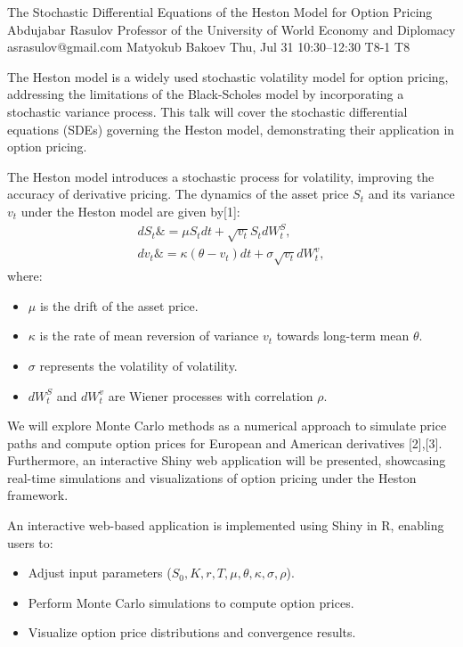 \begin{talk}
  {The Stochastic Differential Equations of the Heston Model for Option Pricing}%
  {Abdujabar Rasulov}%
  {Professor of the University of World Economy and Diplomacy}%
  {asrasulov@gmail.com}%
  {Matyokub Bakoev}%
  {}%
  {Thu, Jul 31 10:30–12:30}%
  {T8-1}%
  {T8}%
  
							
The Heston model is a widely used stochastic volatility model for option pricing, addressing the limitations of the Black-Scholes model by incorporating a stochastic variance process. This talk will cover the stochastic differential equations (SDEs) governing the Heston model, demonstrating their application in option pricing. 

The Heston model introduces a stochastic process for volatility, improving the accuracy of derivative pricing. 
The dynamics of the asset price $S_t$ and its variance $v_t$ under the Heston model are given by[1]:
\begin{align}
    dS_t \&= \mu S_t dt + \sqrt{v_t} S_t dW_t^S, \\
    dv_t \&= \kappa(\theta - v_t) dt + \sigma \sqrt{v_t} dW_t^v,
\end{align}
where:
\begin{itemize}
    \item $\mu$ is the drift of the asset price.
    \item $\kappa$ is the rate of mean reversion of variance $v_t$ towards long-term mean $\theta$.
    \item $\sigma$ represents the volatility of volatility.
    \item $dW_t^S$ and $dW_t^v$ are Wiener processes with correlation $\rho$.
\end{itemize}

We will explore Monte Carlo methods as a numerical approach to simulate price paths and compute option prices for European and American derivatives [2],[3]. Furthermore, an interactive Shiny web application will be presented, showcasing real-time simulations and visualizations of option pricing under the Heston framework.

An interactive web-based application is implemented using Shiny in R, enabling users to:
\begin{itemize}
    \item Adjust input parameters ($S_0, K, r, T, \mu, \theta, \kappa, \sigma, \rho$).
    \item Perform Monte Carlo simulations to compute option prices.
    \item Visualize option price distributions and convergence results.
\end{itemize}


\end{talk}
